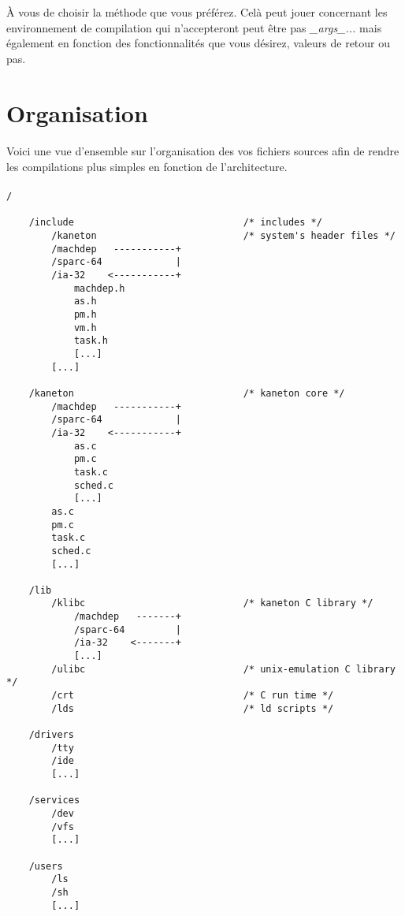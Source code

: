 \documentclass[10pt,a4wide]{article}
\begin{document}
\`A vous de choisir la m\'ethode que vous pr\'ef\'erez. Cel\`a peut jouer
concernant les environnement de compilation qui n'accepteront peut \^etre pas
\textit{\_args\_...} mais \'egalement en fonction des fonctionnalit\'es que vous
d\'esirez, valeurs de retour ou pas.

\section{Organisation}

\paragraph{}

Voici une vue d'ensemble sur l'organisation des vos fichiers sources
afin de rendre les compilations plus simples en fonction de l'architecture.

\paragraph{}

\begin{verbatim}
/

    /include                              /* includes */
        /kaneton                          /* system's header files */
        /machdep   -----------+
        /sparc-64             |
        /ia-32    <-----------+
            machdep.h
            as.h
            pm.h
            vm.h
            task.h
            [...]
        [...]

    /kaneton                              /* kaneton core */
        /machdep   -----------+
        /sparc-64             |
        /ia-32    <-----------+
            as.c
            pm.c
            task.c
            sched.c
            [...]
        as.c
        pm.c
        task.c
        sched.c
        [...]

    /lib
        /klibc                            /* kaneton C library */
            /machdep   -------+
            /sparc-64         |
            /ia-32    <-------+
            [...]
        /ulibc                            /* unix-emulation C library */
        /crt                              /* C run time */
        /lds                              /* ld scripts */

    /drivers
        /tty
        /ide
        [...]

    /services
        /dev
        /vfs
        [...]

    /users
        /ls
        /sh
        [...]
\end{verbatim}
\end{document}
